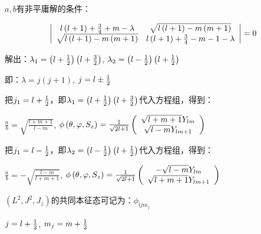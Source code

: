 $a,b$有非平庸解的条件：


\begin{equation}\label{30-6}
\left| {\begin{array}{*{20}c}
   {l\left( {l + 1} \right) + {\textstyle{3 \over 4}} + m - \lambda } & {\sqrt {l\left( {l + 1} \right) - m\left( {m + 1} \right)} }  \\
   {\sqrt {l\left( {l + 1} \right) - m\left( {m + 1} \right)} } & {l\left( {l + 1} \right) + {\textstyle{3 \over 4}} - m - 1 - \lambda }  \\
\end{array}} \right| = 0
\end{equation}


解出：$\lambda _1  = \left( {l + {\textstyle{1 \over 2}}} \right)\left( {l + {\textstyle{3 \over 2}}} \right)$, $\lambda _2  = \left( {l - {\textstyle{1 \over 2}}} \right)\left( {l + {\textstyle{1 \over 2}}} \right)$

即：$\lambda  = j\left( {j + 1} \right)$, $j = l \pm {\textstyle{1 \over 2}}$


把$j_1  = l + {\textstyle{1 \over 2}}$，即$\lambda _1  = \left( {l + {\textstyle{1 \over 2}}} \right)\left( {l + {\textstyle{3 \over 2}}} \right)$代入方程组，得到：

$\frac{a}{b} = \sqrt {\frac{{l + m + 1}}{{l - m}}} $, $\phi \left( {\theta ,\varphi ,S_z } \right) = \frac{1}{{\sqrt {2l + 1} }}\left( {\begin{array}{*{20}c}
   {\sqrt {l + m + 1} Y_{lm} }  \\
   {\sqrt {l - m} Y_{lm + 1} }  \\
\end{array}} \right)$


把$j_1  = l - {\textstyle{1 \over 2}}$，即$\lambda _2  = \left( {l - {\textstyle{1 \over 2}}} \right)\left( {l + {\textstyle{1 \over 2}}} \right)$代入方程组，得到：

$\frac{a}{b} =  - \sqrt {\frac{{l - m}}{{l + m + 1}}} $, $\phi \left( {\theta ,\varphi ,S_z } \right) = \frac{1}{{\sqrt {2l + 1} }}\left( {\begin{array}{*{20}c}
   { - \sqrt {l - m} Y_{lm} }  \\
   {\sqrt {l + m + 1} Y_{lm + 1} }  \\
\end{array}} \right)$


$\left( {L^2 ,J^2 ,J_z } \right)$的共同本征态可记为：$\phi _{ljm_j } $


$j = l + {\textstyle{1 \over 2}}$, $m_j  = m + {\textstyle{1 \over 2}}$



